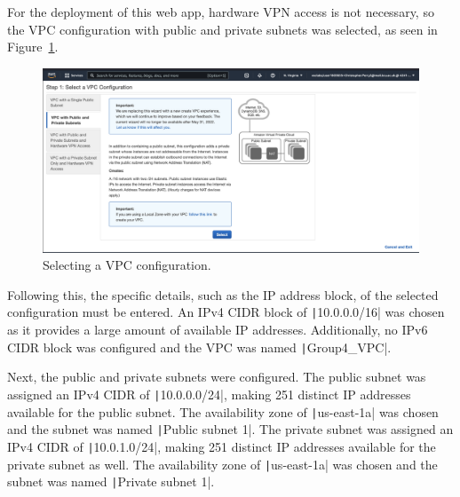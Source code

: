 For the deployment of this web app, hardware VPN access is not necessary, so the VPC configuration with public and
private subnets was selected, as seen in Figure~\ref{fig:vpc-step-1}.

\begin{figure}[!htbp]
    \centering
    \includegraphics[width=\textwidth]{resources/vpc/step_1_select_a_vpc_configuration}
    \caption{Selecting a VPC configuration.}
    \label{fig:vpc-step-1}
\end{figure}

Following this, the specific details, such as the IP address block, of the selected configuration must be entered.
An IPv4 CIDR block of \texttt|10.0.0.0/16| was chosen as it provides a large amount of available IP addresses.
Additionally, no IPv6 CIDR block was configured and the VPC was named \texttt|Group4_VPC|.

Next, the public and private subnets were configured.
The public subnet was assigned an IPv4 CIDR of \texttt|10.0.0.0/24|, making 251 distinct IP addresses available
for the public subnet.
The availability zone of \texttt|us-east-1a| was chosen and the subnet was named
\texttt|Public subnet 1|.
The private subnet was assigned an IPv4 CIDR of \texttt|10.0.1.0/24|, making 251 distinct IP addresses
available for the private subnet as well.
The availability zone of \texttt|us-east-1a| was chosen and the subnet was named
\texttt|Private subnet 1|.


